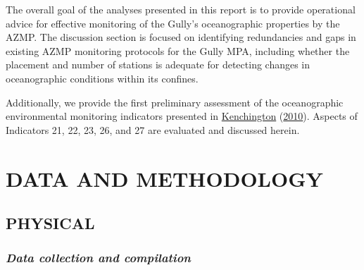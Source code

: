 \documentclass[12pt]{article}\usepackage[]{graphicx}\usepackage[]{color}
\begin{document}
The overall goal of the analyses presented in this report is to provide operational advice for effective monitoring of the Gully's oceanographic properties by the AZMP. The discussion section is focused on identifying redundancies and gaps in existing AZMP monitoring protocols for the Gully MPA, including whether the placement and number of stations is adequate for detecting changes in oceanographic conditions within its confines.

Additionally, we provide the first preliminary assessment of the oceanographic environmental monitoring indicators presented in \protect\hyperlink{ref-kenchington_2010}{Kenchington} (\protect\hyperlink{ref-kenchington_2010}{2010}). Aspects of Indicators 21, 22, 23, 26, and 27 are evaluated and discussed herein.

\clearpage

\hypertarget{sec:data}{%
\section{DATA AND METHODOLOGY}\label{sec:data}}

\hypertarget{sec:physical-data}{%
\subsection{\texorpdfstring{\textbf{PHYSICAL}}{PHYSICAL}}\label{sec:physical-data}}

\hypertarget{data-collection-and-compilation}{%
\subsubsection{\texorpdfstring{\emph{Data collection and compilation}}{Data collection and compilation}}\label{data-collection-and-compilation}}
\end{document}
